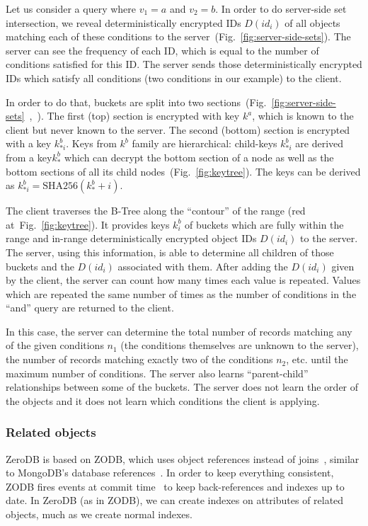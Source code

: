 \documentclass[notitlepage,longbibliography]{revtex4-1}
\newcommand{\figref}[1]{Fig.~\ref{#1}}
\begin{document}
Let us consider a query where $v_1=a$ and $v_2=b$.
In order to do server-side set intersection, we reveal deterministically encrypted IDs $D(id_i)$ of all objects matching each of these conditions to the server~(\figref{fig:server-side-sets}).
The server can see the frequency of each ID, which is equal to the number of conditions satisfied for this ID.
The server sends those deterministically encrypted IDs which satisfy all conditions (two conditions in our example) to the client.

In order to do that, buckets are split into two sections~(\figref{fig:server-side-sets}~,~).
The first (top) section is encrypted with key $k^a$, which is known to the client but never known to the server.
The second (bottom) section is encrypted with a key $k^b_{*i}$.
Keys from $k^b$ family are hierarchical: child-keys $k^b_{*i}$ are derived from a key$k^b_*$  which can decrypt the bottom section of a node as well as the bottom sections of all its child nodes~(\figref{fig:keytree}).
The keys can be derived as $k^b_{*i} = \mbox{SHA256}(k^b_* + i)$.

The client traverses the B-Tree along the ``contour'' of the range (red at~\figref{fig:keytree}).
It provides keys $k^b_i$ of buckets which are fully within the range and in-range deterministically encrypted object IDs $D(id_i)$ to the server.
The server, using this information, is able to determine all children of those buckets and the $D(id_i)$ associated with them.
After adding the $D(id_i)$ given by the client, the server can count how many times each value is repeated.
Values which are repeated the same number of times as the number of conditions in the ``and'' query are returned to the client.

In this case, the server can determine the total number of records matching any of the given conditions $n_1$ (the conditions themselves are unknown to the server),
the number of records matching exactly two of the conditions $n_2$,
etc. until the maximum number of conditions.
The server also learns ``parent-child'' relationships between some of the buckets.
The server does not learn the order of the objects and it does not learn which conditions the client is applying.

\subsubsection{Related objects}

ZeroDB is based on ZODB, which uses object references instead of joins~\cite{zodb-references},
similar to MongoDB's database references~\cite{mongo-db-references}.
In order to keep everything consistent, ZODB fires events at commit time~\cite{zope-events} to keep back-references and indexes up to date.
In ZeroDB (as in ZODB), we can create indexes on attributes of related objects, much as we create normal indexes.
\end{document}
